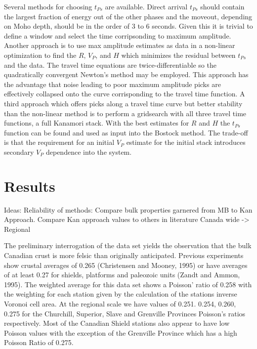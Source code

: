 \documentclass[draft]{article}
\begin{document}
Several methods for choosing $t_{Ps}$ are available. Direct arrival $t_{Ps}$ should contain the largest fraction of energy out of the other phases and the moveout, depending on Moho depth, should be in the order of 3 to 6 seconds. Given this it is trivial to define a window and select the time corripsonding to maximum amplitude. Another approach is to use max amplitude estimates as data in a non-linear optimization to find the $R$, $V_P$, and $H$ which minimizes the residual between $t_{Ps}$ and the data. The travel time equations are twice-differentiable so the quadratically convergent Newton's method may be employed. This approach has the advantage that noise leading to poor maximum amplitude picks are effectively collapsed onto the curve corrisponding to the travel time function. A third approach which offers picks along a travel time curve but better stability than the non-linear method is to perform a gridsearch with all three travel time functions, a full Kanamori stack. With the best estimates for $R$ and $H$ the $t_{Ps}$ function can be found and used as input into the Bostock method. The trade-off is that the requirement for an initial $V_P$ estimate for the initial stack introduces secondary $V_P$ dependence into the system.



\section{Results}
Ideas:
Reliability of methods:
  Compare bulk properties garnered from MB to Kan Approach.
  Compare Kan approach values to others in literature
  Canada wide -> Regional

  The preliminary interrogation of the data set yields the observation that the bulk Canadian crust is more felsic than originally anticipated. Previous experiments show crustal averages of 0.265 (Christensen and Mooney, 1995) or have averages of at least 0.27 for shields, platforms and paleozoic units (Zandt and Ammon, 1995). The weighted average for this data set shows a Poisson' ratio of 0.258 with the weighting for each station given by the calculation of the stations inverse Voronoi cell area. At the regional scale we have values of 0.251. 0.254, 0.260, 0.275 for the Churchill, Superior, Slave and Grenville Provinces Poisson's ratios respectively. Most of the Canadian Shield stations also appear to have low Poisson values with the exception of the Grenville Province which has a high Poisson Ratio of 0.275.
\end{document}
